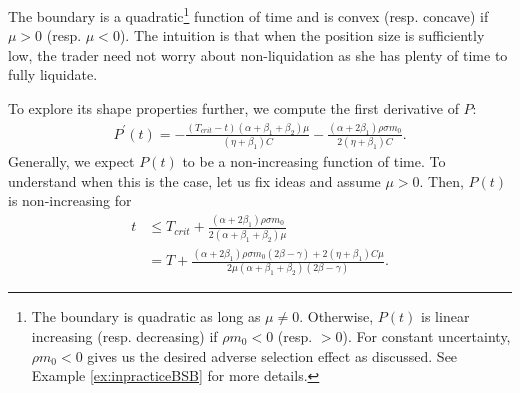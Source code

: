 \documentclass[12pt, letterpaper]{article}
\numberwithin{equation}{section}
\numberwithin{theorem}{section}
\begin{document}
The boundary is a quadratic\footnote{The boundary is quadratic as long as $\mu\neq0$. Otherwise, $P(t)$ is linear increasing (resp. decreasing) if $\rho m_0<0$ (resp. $>0$). For constant uncertainty, $\rho m_0<0$ gives us the desired adverse selection effect as discussed. See Example \ref{ex:inpracticeBSB} for more details.} function of time and is convex (resp. concave) if $\mu>0$ (resp. $\mu<0$). The intuition is that when the position size is sufficiently  low, the trader need not worry about non-liquidation as she has plenty of time to fully liquidate. 

To explore its shape properties further, we compute the first derivative of $P$:
\begin{equation*}
\begin{aligned} 
P^\prime(t)=-\frac{(T_{crit}-t)(\alpha+\beta_1+\beta_2)\mu}{(\eta+\beta_1)C}-\frac{(\alpha+2\beta_1)\rho\sigma m_0}{2(\eta+\beta_1)C}.
\end{aligned}
\end{equation*}
Generally, we expect $P(t)$ to be a non-increasing function of time. To understand when this is the case, let us fix ideas and assume $\mu>0$. Then, $P(t)$ is non-increasing for 
\begin{align} \label{wowineq}
t&\le T_{crit}+\frac{(\alpha+2\beta_1)\rho\sigma m_0}{2(\alpha+\beta_1+\beta_2)\mu}\\
&=T+\frac{(\alpha+2\beta_1)\rho\sigma m_0(2\beta-\gamma)+2(\eta+\beta_1)C\mu}{2\mu(\alpha+\beta_1+\beta_2)(2\beta-\gamma)}.
\end{align}

\end{document}

